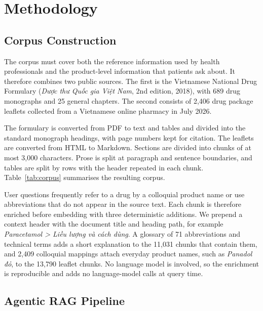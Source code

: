 \section{Methodology}\label{sec:method}
\suppressfloats[t]

\subsection{Corpus Construction}\label{sec:corpus}

The corpus must cover both the reference information used by health professionals and the product-level information that patients ask about. It therefore combines two public sources. The first is the Vietnamese National Drug Formulary (\textit{Dược thư Quốc gia Việt Nam}, 2nd edition, 2018), with 689 drug monographs and 25 general chapters. The second consists of 2{,}406 drug package leaflets collected from a Vietnamese online pharmacy in July 2026.

The formulary is converted from PDF to text and tables and divided into the standard monograph headings, with page numbers kept for citation. The leaflets are converted from HTML to Markdown. Sections are divided into chunks of at most 3{,}000 characters. Prose is split at paragraph and sentence boundaries, and tables are split by rows with the header repeated in each chunk. Table~\ref{tab:corpus} summarises the resulting corpus.



User questions frequently refer to a drug by a colloquial product name or use abbreviations that do not appear in the source text. Each chunk is therefore enriched before embedding with three deterministic additions. We prepend a context header with the document title and heading path, for example \textit{Paracetamol > Liều lượng và cách dùng}. A glossary of 71 abbreviations and technical terms adds a short explanation to the 11{,}031 chunks that contain them, and 2{,}409 colloquial mappings attach everyday product names, such as \textit{Panadol đỏ}, to the 13{,}790 leaflet chunks. No language model is involved, so the enrichment is reproducible and adds no language-model calls at query time.

\subsection{Agentic RAG Pipeline}\label{sec:pipeline}



